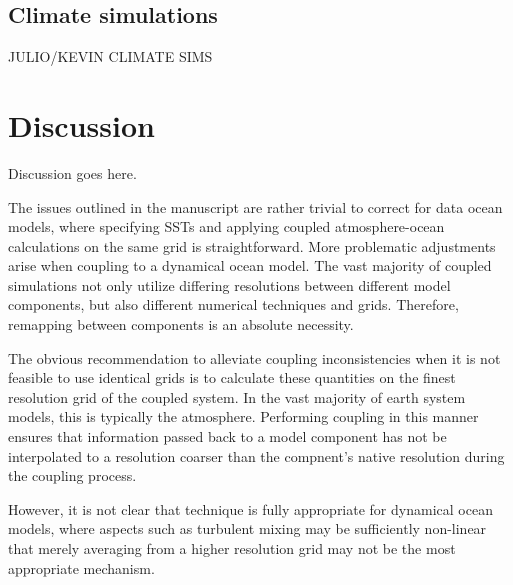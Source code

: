 \documentclass[draft,ms]{AGUTeX}
\begin{document}
\begin{article}
\subsection{Climate simulations}
\label{sec:climate}

{\color{red} JULIO/KEVIN CLIMATE SIMS}


\section{Discussion}
\label{sec:discussion}

{\color{red} Discussion goes here.}

The issues outlined in the manuscript are rather trivial to correct for data ocean models, where specifying SSTs and applying coupled atmosphere-ocean calculations on the same grid is straightforward. More problematic adjustments arise when coupling to a dynamical ocean model. The vast majority of coupled simulations not only utilize differing resolutions between different model components, but also different numerical techniques and grids. Therefore, remapping between components is an absolute necessity.

The obvious recommendation to alleviate coupling inconsistencies when it is not feasible to use identical grids is to calculate these quantities on the finest resolution grid of the coupled system. In the vast majority of earth system models, this is typically the atmosphere. Performing coupling in this manner ensures that information passed back to a model component has not be interpolated to a resolution coarser than the compnent's native resolution during the coupling process.

However, it is not clear that technique is fully appropriate for dynamical ocean models, where aspects such as turbulent mixing may be sufficiently non-linear that merely averaging from a higher resolution grid may not be the most appropriate mechanism.





\end{article}
\end{document}
